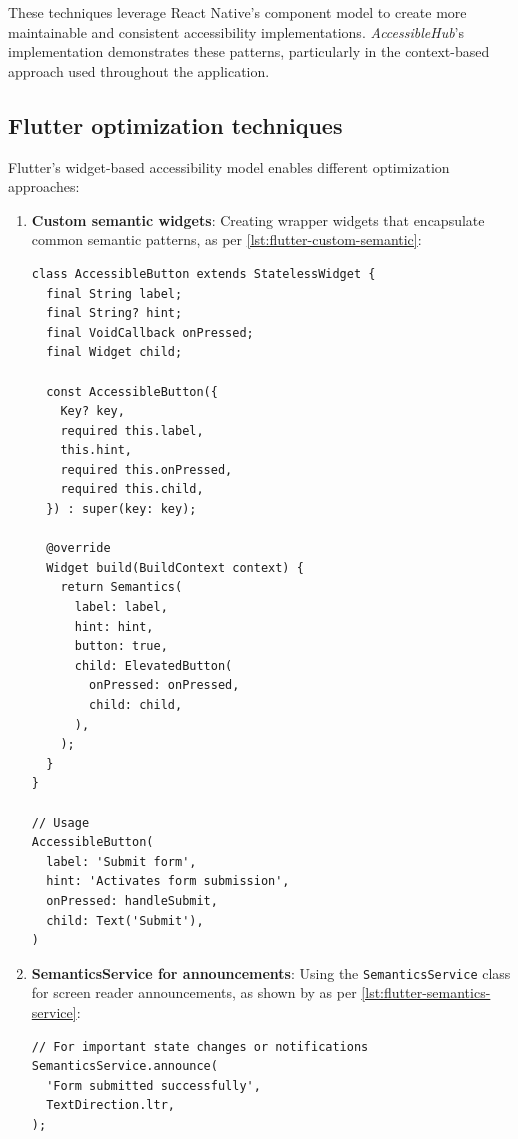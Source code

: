 These techniques leverage React Native's component model to create more maintainable and consistent accessibility implementations. \textit{AccessibleHub}'s implementation demonstrates these patterns, particularly in the context-based approach used throughout the application.

\subsection{Flutter optimization techniques}
\label{subsec:flutter-optimization}

Flutter's widget-based accessibility model enables different optimization approaches:

\begin{enumerate}
    \item \textbf{Custom semantic widgets}: Creating wrapper widgets that encapsulate common semantic patterns, as per \ref{lst:flutter-custom-semantic}:
    
    \begin{lstlisting}[style=DartStyle, caption=Custom semantic widget in Flutter, label=lst:flutter-custom-semantic]
class AccessibleButton extends StatelessWidget {
  final String label;
  final String? hint;
  final VoidCallback onPressed;
  final Widget child;

  const AccessibleButton({
    Key? key,
    required this.label,
    this.hint,
    required this.onPressed,
    required this.child,
  }) : super(key: key);

  @override
  Widget build(BuildContext context) {
    return Semantics(
      label: label,
      hint: hint,
      button: true,
      child: ElevatedButton(
        onPressed: onPressed,
        child: child,
      ),
    );
  }
}

// Usage
AccessibleButton(
  label: 'Submit form',
  hint: 'Activates form submission',
  onPressed: handleSubmit,
  child: Text('Submit'),
)
    \end{lstlisting}

\pagebreak
    
    \item \textbf{SemanticsService for announcements}: Using the \texttt{SemanticsService} class for screen reader announcements, as shown by as per \ref{lst:flutter-semantics-service}:
    
    \begin{lstlisting}[style=DartStyle, caption=SemanticsService usage in Flutter, label=lst:flutter-semantics-service]
// For important state changes or notifications
SemanticsService.announce(
  'Form submitted successfully',
  TextDirection.ltr,
);
    \end{lstlisting}


\end{enumerate}
